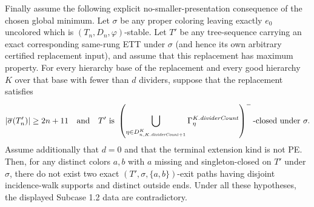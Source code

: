 \begin{lemma}
Finally assume the following explicit no-smaller-presentation consequence
of the chosen global minimum.  Let $\sigma$ be any proper coloring leaving
exactly $e_0$ uncolored which is $(T_n,D_n,\varphi)$-stable.  Let $T'$ be
any tree-sequence carrying an exact corresponding same-rung ETT under
$\sigma$ (and hence its own arbitrary certified replacement input), and
assume that this replacement has maximum property.  For every hierarchy
base of the replacement and every good hierarchy $K$ over that base with
fewer than $d$ dividers, suppose that the replacement satisfies
\[
 |\overline\sigma(T'_n)|\geq2n+11
 \quad\hbox{and}\quad
 T'\text{ is }
 \left(\bigcup_{\eta\in D^K_{n,K.\mathit{dividerCount}+1}}
   \Gamma^{K.\mathit{dividerCount}}_\eta\right)^-
 \text{-closed under }\sigma .
\]
Assume additionally that $d=0$ and that the terminal extension kind is
not PE.  Then, for any distinct colors $a,b$ with $a$ missing and singleton-closed
on $T'$ under $\sigma$, there do not exist two exact
$(T',\sigma,\{a,b\})$-exit paths having disjoint incidence-walk supports
and distinct outside ends.  Under all these hypotheses, the displayed
Subcase 1.2 data are contradictory.
\end{lemma}
